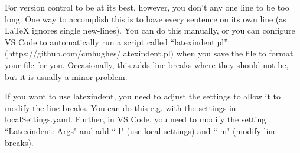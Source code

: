 \documentclass{article}
\begin{document}
For version control to be at its best, however, you don't any one line to be too long.
One way to accomplish this is to have every sentence on its own line (as LaTeX ignores single new-lines).
You can do this manually, or you can configure VS Code to automatically run a script called ``latexindent.pl'' (https://github.com/cmhughes/latexindent.pl) when you save the file to format your file for you. Occasionally, this adds line breaks where they should not be, but it is usually a minor problem.

If you want to use latexindent, you need to adjust the settings to allow it to modify the line breaks. You can do this e.g. with the settings in localSettings.yaml. Further, in VS Code, you need to modify the setting ``Latexindent: Args" and add ``-l" (use local settings) and ``-m" (modify line breaks).
\end{document}
